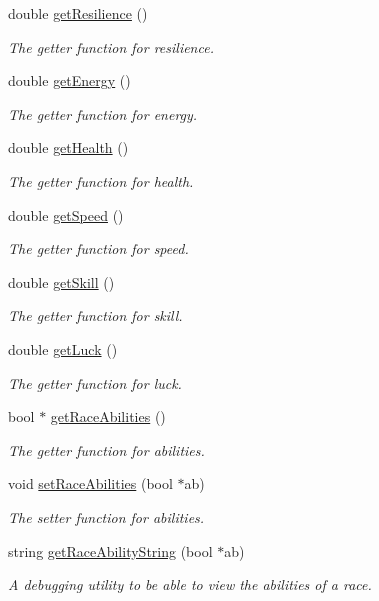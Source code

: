\begin{DoxyCompactItemize}
double \mbox{\hyperlink{class_race_a28130b5cbfe0756a6d994cd36cd74eb8}{get\+Resilience}} ()
\begin{DoxyCompactList}\small\item\em The getter function for resilience. \end{DoxyCompactList}\item 
double \mbox{\hyperlink{class_race_a7cde6aed828e203d613c09c5957fd351}{get\+Energy}} ()
\begin{DoxyCompactList}\small\item\em The getter function for energy. \end{DoxyCompactList}\item 
double \mbox{\hyperlink{class_race_aab95fe052513d6687f9f209e13fdcb4f}{get\+Health}} ()
\begin{DoxyCompactList}\small\item\em The getter function for health. \end{DoxyCompactList}\item 
double \mbox{\hyperlink{class_race_ada1056031aa39b26d1ffe522a56ca70c}{get\+Speed}} ()
\begin{DoxyCompactList}\small\item\em The getter function for speed. \end{DoxyCompactList}\item 
double \mbox{\hyperlink{class_race_aee463d08816aef0916a7f56821cc8eca}{get\+Skill}} ()
\begin{DoxyCompactList}\small\item\em The getter function for skill. \end{DoxyCompactList}\item 
double \mbox{\hyperlink{class_race_a503ddb5daf02df19da4a1bcf27bc0012}{get\+Luck}} ()
\begin{DoxyCompactList}\small\item\em The getter function for luck. \end{DoxyCompactList}\item 
bool $\ast$ \mbox{\hyperlink{class_race_a79b3f4908fd0c1e87a8160758ec78b6e}{get\+Race\+Abilities}} ()
\begin{DoxyCompactList}\small\item\em The getter function for abilities. \end{DoxyCompactList}\item 
void \mbox{\hyperlink{class_race_a920ae703837c0514eb9a45eb0453ac0e}{set\+Race\+Abilities}} (bool $\ast$ab)
\begin{DoxyCompactList}\small\item\em The setter function for abilities. \end{DoxyCompactList}\item 
string \mbox{\hyperlink{class_race_a2624c16d0787ebf05bacab726159c9e7}{get\+Race\+Ability\+String}} (bool $\ast$ab)
\begin{DoxyCompactList}\small\item\em A debugging utility to be able to view the abilities of a race. \end{DoxyCompactList}\end{DoxyCompactItemize}


